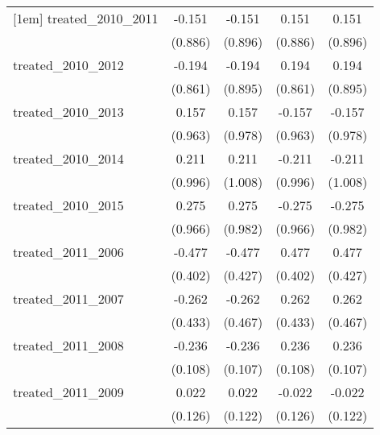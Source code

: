 {\begin{tabular}{l*{4}{c}}
[1em]
treated\_2010\_2011&      -0.151         &      -0.151         &       0.151         &       0.151         \\
            &     (0.886)         &     (0.896)         &     (0.886)         &     (0.896)         \\
[1em]
treated\_2010\_2012&      -0.194         &      -0.194         &       0.194         &       0.194         \\
            &     (0.861)         &     (0.895)         &     (0.861)         &     (0.895)         \\
[1em]
treated\_2010\_2013&       0.157         &       0.157         &      -0.157         &      -0.157         \\
            &     (0.963)         &     (0.978)         &     (0.963)         &     (0.978)         \\
[1em]
treated\_2010\_2014&       0.211         &       0.211         &      -0.211         &      -0.211         \\
            &     (0.996)         &     (1.008)         &     (0.996)         &     (1.008)         \\
[1em]
treated\_2010\_2015&       0.275         &       0.275         &      -0.275         &      -0.275         \\
            &     (0.966)         &     (0.982)         &     (0.966)         &     (0.982)         \\
[1em]
treated\_2011\_2006&      -0.477         &      -0.477         &       0.477         &       0.477         \\
            &     (0.402)         &     (0.427)         &     (0.402)         &     (0.427)         \\
[1em]
treated\_2011\_2007&      -0.262         &      -0.262         &       0.262         &       0.262         \\
            &     (0.433)         &     (0.467)         &     (0.433)         &     (0.467)         \\
[1em]
treated\_2011\_2008&      -0.236\sym{*}  &      -0.236\sym{*}  &       0.236\sym{*}  &       0.236\sym{*}  \\
            &     (0.108)         &     (0.107)         &     (0.108)         &     (0.107)         \\
[1em]
treated\_2011\_2009&       0.022         &       0.022         &      -0.022         &      -0.022         \\
            &     (0.126)         &     (0.122)         &     (0.126)         &     (0.122)         \\

\end{tabular}}
